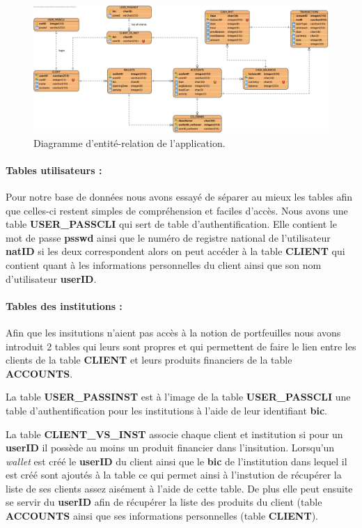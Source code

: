 \documentclass[../rapport.tex]{subfiles}
\begin{document}
	
	\begin{figure}[h]
		\centering \includegraphics[scale=0.4]{ressources/erd.png}
		\caption{Diagramme d'entité-relation de l'application.}
	\end{figure}
	
	\paragraph{Tables utilisateurs :}
	Pour notre base de données nous avons essayé de séparer au mieux les tables afin que celles-ci restent simples de compréhension et faciles d'accès. Nous avons une table \textbf{USER\_PASSCLI} qui sert de table d'authentification. Elle contient le mot de passe \textbf{psswd} ainsi que le numéro de registre national de l'utilisateur \textbf{natID} si les deux correspondent alors on peut accéder à la table \textbf{CLIENT} qui contient quant à les informations personnelles du client ainsi que son nom d'utilisateur \textbf{userID}.
	
	\paragraph{Tables des institutions :} Afin que les insitutions n'aient pas accès à la notion de portfeuilles nous avons introduit 2 tables qui leurs sont propres et qui permettent de faire le lien entre les clients de la table \textbf{CLIENT} et leurs produits financiers de la table \textbf{ACCOUNTS}.
	
	\medskip
	
	La table \textbf{USER\_PASSINST} est à l'image de la table \textbf{USER\_PASSCLI} une table d'authentification pour les institutions à l'aide de leur identifiant \textbf{bic}. 
	
	\medskip
	
	La table \textbf{CLIENT\_VS\_INST} associe chaque client et institution si pour un \textbf{userID} il possède au moins un produit financier dans l'insitution. Lorsqu'un \textit{wallet} est créé le \textbf{userID} du client ainsi que le \textbf{bic} de l'institution dans lequel il est créé sont ajoutés à la table ce qui permet ainsi à l'instution de récupérer la liste de ses clients assez aisément à l'aide de cette table. De plus elle peut ensuite se servir du \textbf{userID} afin de récupérer la liste des produits du client (table \textbf{ACCOUNTS} ainsi que ses informations personnelles (table \textbf{CLIENT}).
	
\end{document}
